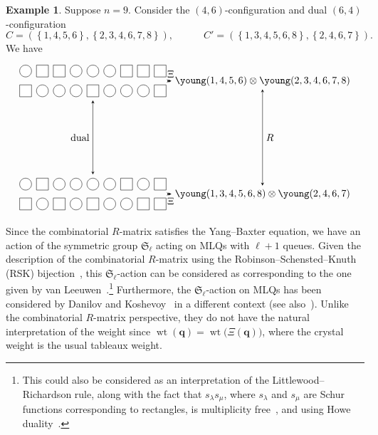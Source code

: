 \documentclass[reqno]{amsart}
\newcommand{\0}{\phantom{c}}
\newcommand{\SymGp}[1]{\mathfrak{S}_{#1}} %
\DeclareMathOperator{\wt}{wt} %
\newcommand{\qq}{\mathbf{q}}
\newcommand{\set}[1]{\left\{ #1 \right\}}
\theoremstyle{plain}
\theoremstyle{definition}
\newtheorem{example}[thm]{Example}
\numberwithin{equation}{section}
\begin{document}
\begin{example}
Suppose $n = 9$.
Consider the $(4,6)$-configuration and dual $(6,4)$-configuration
\[
C = (\set{1,4,5,6}, \set{2,3,4,6,7,8}),
\qquad\quad
C' = (\set{1,3,4,5,6,8}, \set{2,4,6,7}).
\]
We have
\[
\begin{tikzpicture}[xscale=6,yscale=4,>=stealth]
\node (C) at (0,0) { %
\begin{tikzpicture}[scale=0.7]
  \def\sc{0.85}   %
  \def\ll{2}   %
  \def\l{1}   %
  \foreach \i in {1,4,5,6} { \draw[fill=white] (\i*\sc,\ll) circle (0.3); }
  \foreach \i in {2,3,7,8,9} { \draw[fill=white] (\i*\sc-.3,\ll-.3) rectangle +(0.6,+0.6); }
  \foreach \i in {2,3,4,6,7,8} { \draw[fill=white] (\i*\sc,\l) circle (0.3); }
  \foreach \i in {1,5,9} { \draw[fill=white] (\i*\sc-.3,\l-.3) rectangle +(0.6,+0.6); }
\end{tikzpicture}
};
\node (Cp) at (0,-1) { %
\begin{tikzpicture}[scale=0.7]
  \def\sc{0.85}   %
  \def\ll{2}   %
  \def\l{1}   %
  \foreach \i in {1,3,4,5,6,8} { \draw[fill=white] (\i*\sc,\ll) circle (0.3); }
  \foreach \i in {2,7,9} { \draw[fill=white] (\i*\sc-.3,\ll-.3) rectangle +(0.6,+0.6); }
  \foreach \i in {2,4,6,7} { \draw[fill=white] (\i*\sc,\l) circle (0.3); }
  \foreach \i in {1,3,5,8,9} { \draw[fill=white] (\i*\sc-.3,\l-.3) rectangle +(0.6,+0.6); }
\end{tikzpicture}
};
\node (KR) at (1,0) {$\young(1,4,5,6) \otimes \young(2,3,4,6,7,8)$};
\node (KRp) at (1,-1) {$\young(1,3,4,5,6,8) \otimes \young(2,4,6,7)$};
\draw[<->] (C) -- (Cp) node[midway,anchor=east] {dual};
\draw[<->] (C) -- (KR) node[midway,anchor=south] {$\Xi$};
\draw[<->] (KR) -- (KRp) node[midway,anchor=west] {$R$};
\draw[<->] (Cp) -- (KRp) node[midway,anchor=north] {$\Xi$};
\end{tikzpicture}
\]
\end{example}

Since the combinatorial $R$-matrix satisfies the Yang--Baxter equation, we have an action of the symmetric group $\SymGp{\ell}$ acting on MLQs with $\ell + 1$ queues.
Given the description of the combinatorial $R$-matrix using the Robinson--Schensted--Knuth (RSK) bijection~\cite{Shimozono02}, this $\SymGp{\ell}$-action can be considered as corresponding to the one given by van Leeuwen~\cite[Lemma~2.3]{vanLeeuwen-dc}.\footnote{This could also be considered as an interpretation of the Littlewood--Richardson rule, along with the fact that $s_{\lambda} s_{\mu}$, where $s_{\lambda}$ and $s_{\mu}$ are Schur functions corresponding to rectangles, is multiplicity free~\cite{Stembridge01}, and using Howe duality~\cite[Ch.~9,App.~B]{BS17}.}
Furthermore, the $\SymGp{\ell}$-action on MLQs has been considered by Danilov and Koshevoy~\cite{DanilovKoshevoy} in a different context (see also~\cite[Ch.~4]{Gorodentsev2}).
Unlike the combinatorial $R$-matrix perspective, they do not have the natural interpretation of the weight since $\wt(\qq) = \wt\bigl( \Xi(\qq) \bigr)$, where the crystal weight is the usual tableaux weight.
\end{document}
